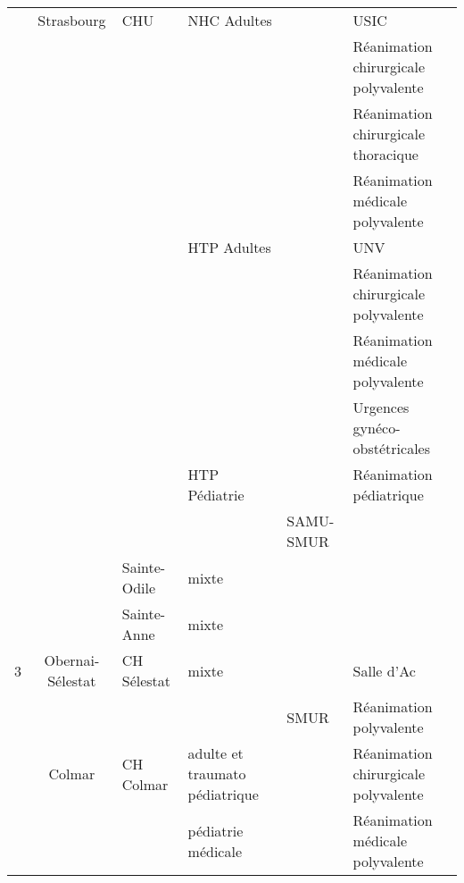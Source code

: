 \documentclass[a4paper,8pt]{article}
\begin{document}
\begin{table}[htbp]
\begin{turn}{90}
\begin{tabular}{|l|c|l|l|l|l|}
\multicolumn{ 1}{|c|}{} & \multicolumn{ 1}{c|}{Strasbourg} & \multicolumn{ 1}{l|}{CHU} & NHC Adultes &  & USIC \\ \cline{ 4- 6}
\multicolumn{ 1}{|c|}{} & \multicolumn{ 1}{c|}{} & \multicolumn{ 1}{l|}{} &  &  & Réanimation chirurgicale polyvalente \\ \cline{ 4- 6}
\multicolumn{ 1}{|c|}{} & \multicolumn{ 1}{c|}{} & \multicolumn{ 1}{l|}{} &  &  & Réanimation chirurgicale thoracique \\ \cline{ 4- 6}
\multicolumn{ 1}{|c|}{} & \multicolumn{ 1}{c|}{} & \multicolumn{ 1}{l|}{} &  &  & Réanimation médicale polyvalente \\ \cline{ 4- 6}
\multicolumn{ 1}{|c|}{} & \multicolumn{ 1}{c|}{} & \multicolumn{ 1}{l|}{} & HTP Adultes &  & UNV \\ \cline{ 4- 6}
\multicolumn{ 1}{|c|}{} & \multicolumn{ 1}{c|}{} & \multicolumn{ 1}{l|}{} &  &  & Réanimation chirurgicale polyvalente \\ \cline{ 4- 6}
\multicolumn{ 1}{|c|}{} & \multicolumn{ 1}{c|}{} & \multicolumn{ 1}{l|}{} &  &  & Réanimation médicale polyvalente \\ \cline{ 4- 6}
\multicolumn{ 1}{|c|}{} & \multicolumn{ 1}{c|}{} & \multicolumn{ 1}{l|}{} &  &  & Urgences gynéco-obstétricales \\ \cline{ 4- 6}
\multicolumn{ 1}{|c|}{} & \multicolumn{ 1}{c|}{} & \multicolumn{ 1}{l|}{} & HTP Pédiatrie &  & Réanimation pédiatrique \\ \cline{ 4- 6}
\multicolumn{ 1}{|c|}{} & \multicolumn{ 1}{c|}{} & \multicolumn{ 1}{l|}{} &  & SAMU-SMUR &  \\ \cline{ 3- 6}
\multicolumn{ 1}{|c|}{} & \multicolumn{ 1}{c|}{} & Sainte-Odile & mixte &  &  \\ \cline{ 3- 6}
\multicolumn{ 1}{|c|}{} & \multicolumn{ 1}{c|}{} & Sainte-Anne & mixte &  &  \\ \hline
\multicolumn{ 1}{|c|}{3} & \multicolumn{ 1}{c|}{Obernai-Sélestat} & \multicolumn{ 1}{l|}{CH Sélestat} & mixte &  & Salle d'Ac \\ \cline{ 4- 6}
\multicolumn{ 1}{|l|}{} & \multicolumn{ 1}{c|}{} & \multicolumn{ 1}{l|}{} &  & SMUR & Réanimation polyvalente \\ \cline{ 2- 6}
\multicolumn{ 1}{|l|}{} & \multicolumn{ 1}{c|}{Colmar} & \multicolumn{ 1}{l|}{CH Colmar} & adulte et traumato pédiatrique &  & Réanimation chirurgicale polyvalente \\ \cline{ 4- 6}
\multicolumn{ 1}{|l|}{} & \multicolumn{ 1}{c|}{} & \multicolumn{ 1}{l|}{} & pédiatrie médicale &  & Réanimation médicale polyvalente \\ \cline{ 4- 6}

\end{tabular}
\end{turn}
\end{table}
\end{document}
